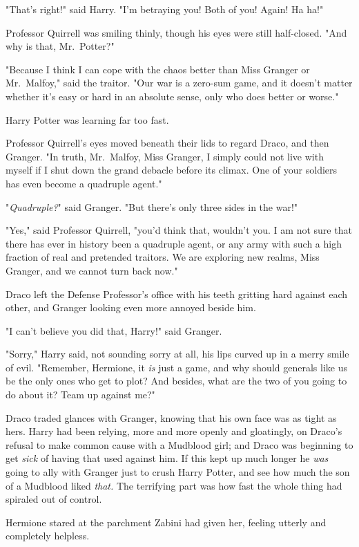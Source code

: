 "That's right!" said Harry. "I'm betraying you! Both of you! Again! Ha ha!"

Professor Quirrell was smiling thinly, though his eyes were still half-closed.
"And why is that, Mr.~Potter?"

"Because I think I can cope with the chaos better than Miss Granger or
Mr.~Malfoy," said the traitor. "Our war is a zero-sum game, and it doesn't
matter whether it's easy or hard in an absolute sense, only who does better or
worse."

Harry Potter was learning far too fast.

Professor Quirrell's eyes moved beneath their lids to regard Draco, and then
Granger. "In truth, Mr.~Malfoy, Miss Granger, I simply could not live with
myself if I shut down the grand debacle before its climax. One of your soldiers
has even become a quadruple agent."

"\emph{Quadruple?}" said Granger. "But there's only three sides in the war!"

"Yes," said Professor Quirrell, "you'd think that, wouldn't you. I am not sure
that there has ever in history been a quadruple agent, or any army with such a
high fraction of real and pretended traitors. We are exploring new realms, Miss
Granger, and we cannot turn back now."

Draco left the Defense Professor's office with his teeth gritting hard against
each other, and Granger looking even more annoyed beside him.

"I can't believe you did that, Harry!" said Granger.

"Sorry," Harry said, not sounding sorry at all, his lips curved up in a merry
smile of evil. "Remember, Hermione, it \emph{is} just a game, and why should
generals like us be the only ones who get to plot? And besides, what are the
two of you going to do about it? Team up against me?"

Draco traded glances with Granger, knowing that his own face was as tight as
hers. Harry had been relying, more and more openly and gloatingly, on Draco's
refusal to make common cause with a Mudblood girl; and Draco was beginning to
get \emph{sick} of having that used against him. If this kept up much longer he
\emph{was} going to ally with Granger just to crush Harry Potter, and see how
much the son of a Mudblood liked \emph{that.}
\sbreak
The terrifying part was how fast the whole thing had spiraled out of control.

Hermione stared at the parchment Zabini had given her, feeling utterly and
completely helpless.

